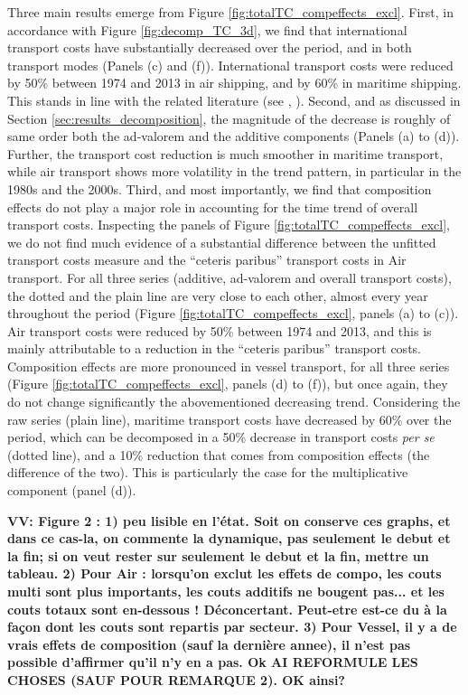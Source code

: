 \documentclass[a4paper,11pt]{article}
\begin{document}
Three main results emerge from Figure \ref{fig:totalTC_compeffects_excl}. First, in accordance with Figure \ref{fig:decomp_TC_3d}, we find that international transport costs have substantially decreased over the period, and in both transport modes (Panels (c) and (f)). International transport costs were reduced by 50\% between 1974 and 2013 in air shipping, and by 60\% in maritime shipping. This stands in line with the related literature (see \citealp{Hummels_1999}, \citealp{Lafourcade_Thisse}). Second, and as discussed in Section \ref{sec:results_decomposition}, the magnitude of the decrease is roughly of same order both the ad-valorem and the additive components (Panels (a) to (d)). Further, the transport cost reduction is much smoother in maritime transport, while air transport shows more volatility in the trend pattern, in particular in the 1980s and the 2000s.
Third, and most importantly, we find that composition effects do not play a major role in accounting for the time trend of overall transport costs. Inspecting the panels of Figure \ref{fig:totalTC_compeffects_excl}, we do not find much evidence of a substantial difference between the unfitted transport costs measure and the ``ceteris paribus'' transport costs in Air transport. For all three series (additive, ad-valorem and overall transport costs), the dotted and the plain line are very close to each other, almost every year throughout the period (Figure \ref{fig:totalTC_compeffects_excl}, panels (a) to (c)). Air transport costs were reduced by 50\% between 1974 and 2013, and this is mainly attributable to a reduction in the ``ceteris paribus'' transport costs. Composition effects are more pronounced in vessel transport, for all three series (Figure \ref{fig:totalTC_compeffects_excl}, panels (d) to (f)), but once again, they do not change significantly the abovementioned decreasing trend. Considering the raw series (plain line), maritime transport costs have decreased by 60\% over the period, which can be decomposed in a 50\% decrease in transport costs \textit{per se} (dotted line), and a 10\% reduction that comes from composition effects (the difference of the two). This is particularly the case for the multiplicative component (panel (d)).\smallskip

\textbf{VV: Figure 2 : 1) peu lisible en l’état. Soit on conserve ces graphs, et dans ce cas-la, on commente la dynamique, pas seulement le debut et la fin; si on veut rester sur seulement le debut et la fin, mettre un tableau. 2) Pour Air : lorsqu’on exclut les effets de compo, les couts multi sont plus importants, les couts additifs ne bougent pas... et les couts totaux sont en-dessous ! Déconcertant. Peut-etre est-ce du à la façon dont les couts sont repartis par secteur. 3) Pour Vessel, il y a de vrais effets de composition (sauf la dernière annee), il n’est pas possible d’affirmer qu’il n’y en a pas. Ok AI REFORMULE LES CHOSES (SAUF POUR REMARQUE 2). OK ainsi? }
\end{document}
